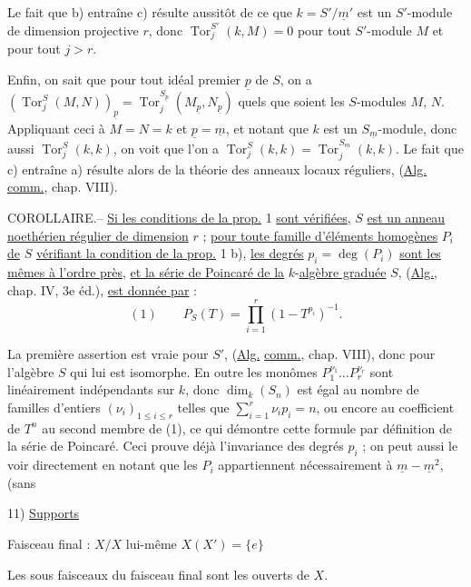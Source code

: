 Le fait que b) entraîne c) résulte aussitôt de ce que $k=S'/\underline m'$ est un $S'$-module de dimension projective $r$, donc $\operatorname{Tor}^{S'}_j(k,M)=0$ pour tout $S'$-module $M$ et pour tout $j>r$.

Enfin, on sait que pour tout idéal premier $\underline p$ de $S$, on a $(\operatorname{Tor}^S_j(M,N))_{\underline p}=\operatorname{Tor}^{S_{\underline p}}_j(M_{\underline p},N_{\underline p})$ quels que soient les $S$-modules $M$, $N$. Appliquant ceci à $M=N=k$ et $\underline p=\underline m$, et notant que $k$ est un $S_{\underline m}$-module, donc aussi $\operatorname{Tor}^S_j(k,k)$, on voit que l'on a $\operatorname{Tor}^S_j(k,k)=\operatorname{Tor}^{S_{\underline m}}_j(k,k)$. Le fait que c) entraîne a) résulte alors de la théorie des anneaux locaux réguliers, (\uline{Alg.} \uline{comm.}, chap. VIII).

COROLLAIRE.-- \uline{Si les conditions de la prop.} 1 \uline{sont vérifiées}, $S$ \uline{est un anneau noethérien régulier de dimension} $r$ ; \uline{pour toute famille d'éléments homogènes} $P_i$ \uline{de} $S$ \uline{vérifiant la condition de la prop.} 1 b), \uline{les degrés} $p_i=\deg(P_i)$ \uline{sont les mêmes à l'ordre près}, \uline{et la série de Poincaré de la} $k$-\uline{algèbre graduée} $S$, (\uline{Alg.}, chap. IV, 3e éd.), \uline{est donnée par} :
\[
(1)\qquad P_S(T)=\prod_{i=1}^r(1-T^{p_i})^{-1}.
\]

La première assertion est vraie pour $S'$, (\uline{Alg.} \uline{comm.}, chap. VIII), donc pour l'algèbre $S$ qui lui est isomorphe. En outre les monômes $P_1^{\nu_1}\ldots P_r^{\nu_r}$ sont linéairement indépendants sur $k$, donc $\dim_k(S_n)$ est égal au nombre de familles d'entiers $(\nu_i)_{1\leq i\leq r}$ telles que $\sum_{i=1}^r\nu_i p_i=n$, ou encore au coefficient de $T^n$ au second membre de (1), ce qui démontre cette formule par définition de la série de Poincaré. Ceci prouve déjà l'invariance des degrés $p_i$ ; on peut aussi le voir directement en notant que les $P_i$ appartiennent nécessairement à $\underline m-\underline m^2$, (sans


11) \uline{Supports}

 Faisceau final : $X/X$ lui-même \qquad $X(X')=\{e\}$

Les sous faisceaux du faisceau final sont les ouverts de $X$.

